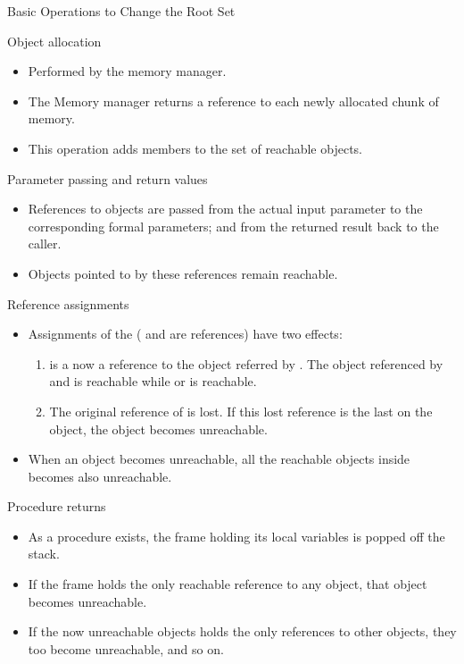 \begin{bibunit}[apalike]
\begin{frame}[allowframebreaks]{Basic Operations to Change the Root Set}
	\begin{block}{Object allocation}
		\begin{itemize}
		\item Performed by the memory manager.
		\item The Memory manager returns a reference to each newly allocated chunk of memory.
		\item This operation adds members to the set of reachable objects.
		\end{itemize}
	\end{block}
	\begin{block}{Parameter passing and return values}
		\begin{itemize}
		\item References to objects are passed from the actual input parameter to the corresponding formal parameters; and from the returned result back to the caller.
		\item Objects pointed to by these references remain reachable.
		\end{itemize}
	\end{block}
	\begin{block}{Reference assignments}
		\begin{itemize}
		\item Assignments of the  ( and  are references) have two effects:
			\begin{enumerate}
			\item {} is a now a reference to the object referred by . The object referenced by  and  is reachable while  or  is reachable.
			\item The original reference of  is lost. If this lost reference is the last on the object, the object becomes unreachable.
			\end{enumerate}
		\item When an object becomes unreachable, all the reachable objects inside becomes also unreachable.
		\end{itemize}
	\end{block}
	\begin{block}{Procedure returns}
		\begin{itemize}
		\item As a procedure exists, the frame holding its local variables is popped off the stack.
		\item If the frame holds the only reachable reference to any object, that object becomes unreachable.
		\item If the now unreachable objects holds the only references to other objects, they too become unreachable, and so on.
		\end{itemize}
	\end{block}
\end{frame}


\end{bibunit}
